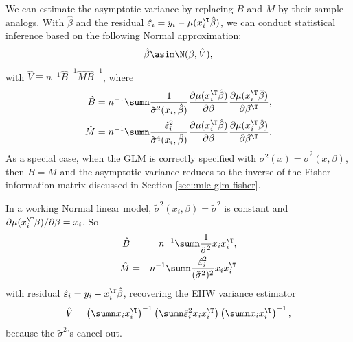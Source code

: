 


We can estimate the asymptotic variance by replacing $B$ and $M$
by their sample analogs.
With $\hat\beta$ and the residual $\hat{\varepsilon}_i = y_{i}-\mu(x_{i}^{\T}\hat{\beta} ) $, we can conduct statistical inference based on the following Normal approximation:
\[
\hat{\beta}\asim\N(\beta,\hat{V}),
\]
with $\hat{V} \equiv n^{-1}\hat{B}^{-1}\hat{M}\hat{B}^{-1}$, 
where 
\begin{align*}
\hat{B} & =n^{-1}\sumn\frac{1}{\tilde{\sigma}^{2}(x_{i}, \hat{\beta})}\frac{\partial\mu(x_{i}^{\T}\hat{\beta})}{\partial\beta}\frac{\partial\mu(x_{i}^{\T}\hat{\beta})}{\partial\beta^{\T}},\\
\hat{M} & =n^{-1}\sumn \frac{ \hat{\varepsilon}_i^2    }{\tilde{\sigma}^{4}(x_{i}, \hat{\beta})} \frac{\partial\mu(x_{i}^{\T}\hat{\beta})}{\partial\beta}\frac{\partial\mu(x_{i}^{\T}\hat{\beta})}{\partial\beta^{\T}}.
\end{align*}
As a special case, when the GLM is correctly specified with $\sigma^2(x) = \tilde{\sigma}^2(x, \beta)$, then $B=M$ and the asymptotic variance reduces to the inverse of the Fisher information matrix discussed in Section \ref{sec::mle-glm-fisher}. 



\setcounter{example}{0}
\begin{example}[continued]\label{eg::gaussianlinearmodel-continue2}
In a working Normal linear model,   $\tilde{\sigma}^2(x_i, \beta)  = \tilde{\sigma}^2$ is constant and 
$  \partial\mu(x_{i}^{\T} \beta ) / \partial\beta  = x_i$. So
\begin{eqnarray*}
\hat{B} &=& n^{-1}\sumn\frac{1}{\tilde{\sigma}^{2} } x_i x_i^{\T},\\ 
\hat{M} &=& n^{-1}\sumn  \frac{   \hat{\varepsilon}_i^2 }{  (\tilde{\sigma}^{2})^2 }  x_i x_i^{\T}
\end{eqnarray*}
with residual $ \hat{\varepsilon}_i  = y_i - x_i^{\T} \hat{\beta}$, recovering the EHW variance estimator
$$
\hat{V} = \left( \sumn   x_i x_i^{\T} \right)^{-1}
\left(\sumn \hat{\varepsilon}_i^2 x_i x_i^{\T} \right)
 \left( \sumn x_i x_i^{\T} \right)^{-1} ,
$$
because the $\tilde{\sigma}^{2}$'s cancel out. 
\end{example}



